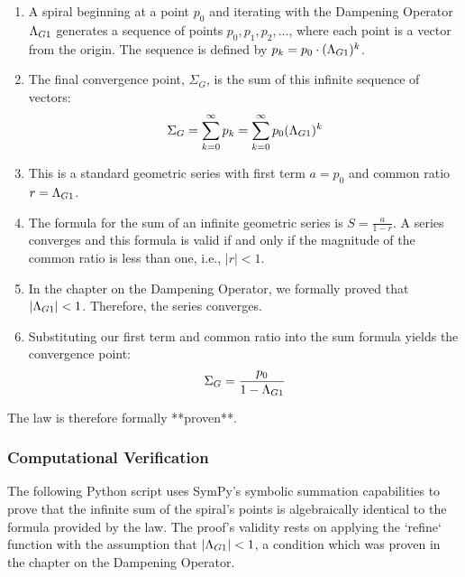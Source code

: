 \begin{enumerate}
    \item A spiral beginning at a point $p_0$ and iterating with the Dampening Operator $\Lambda_{G1}$ generates a sequence of points $p_0, p_1, p_2, \dots$, where each point is a vector from the origin. The sequence is defined by $p_k = p_0 \cdot (\Lambda_{G1})^k$.

    \item The final convergence point, $\Sigma_G$, is the sum of this infinite sequence of vectors:
    $$ \Sigma_G = \sum_{k=0}^{\infty} p_k = \sum_{k=0}^{\infty} p_0 (\Lambda_{G1})^k $$

    \item This is a standard geometric series with first term $a = p_0$ and common ratio $r = \Lambda_{G1}$.

    \item The formula for the sum of an infinite geometric series is $S = \frac{a}{1-r}$. A series converges and this formula is valid if and only if the magnitude of the common ratio is less than one, i.e., $|r| < 1$.

    \item In the chapter on the Dampening Operator, we formally proved that $|\Lambda_{G1}| < 1$.  Therefore, the series converges.

    \item Substituting our first term and common ratio into the sum formula yields the convergence point:
    $$ \Sigma_G = \frac{p_0}{1 - \Lambda_{G1}} $$
\end{enumerate}
The law is therefore formally **proven**.

\subsubsection*{Computational Verification}
The following Python script uses SymPy's symbolic summation capabilities to prove that the infinite sum of the spiral's points is algebraically identical to the formula provided by the law. The proof's validity rests on applying the `refine` function with the assumption that $|\Lambda_{G1}|<1$, a condition which was proven in the chapter on the Dampening Operator. 

